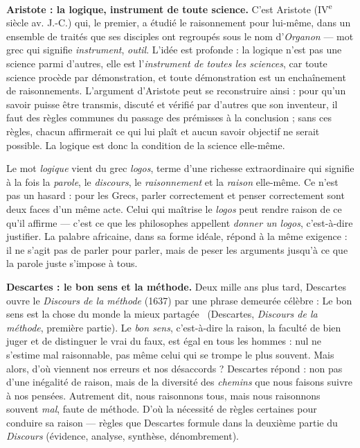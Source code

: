 \documentclass[11pt]{article}
\begin{document}
\textbf{Aristote : la logique, instrument de toute science.} C'est Aristote (IV\textsuperscript{e} siècle av. J.-C.) qui, le premier, a étudié le raisonnement pour lui-même, dans un ensemble de traités que ses disciples ont regroupés sous le nom d'\emph{Organon} — mot grec qui signifie \emph{instrument}, \emph{outil}. L'idée est profonde : la logique n'est pas une science parmi d'autres, elle est l'\emph{instrument de toutes les sciences}, car toute science procède par démonstration, et toute démonstration est un enchaînement de raisonnements. L'argument d'Aristote peut se reconstruire ainsi : pour qu'un savoir puisse être transmis, discuté et vérifié par d'autres que son inventeur, il faut des règles communes du passage des prémisses à la conclusion ; sans ces règles, chacun affirmerait ce qui lui plaît et aucun savoir objectif ne serait possible. La logique est donc la condition de la science elle-même.

\begin{savaistu}
Le mot \emph{logique} vient du grec \emph{logos}, terme d'une richesse extraordinaire qui signifie à la fois la \emph{parole}, le \emph{discours}, le \emph{raisonnement} et la \emph{raison} elle-même. Ce n'est pas un hasard : pour les Grecs, parler correctement et penser correctement sont deux faces d'un même acte. Celui qui maîtrise le \emph{logos} peut rendre raison de ce qu'il affirme — c'est ce que les philosophes appellent \emph{donner un logos}, c'est-à-dire justifier. La palabre africaine, dans sa forme idéale, répond à la même exigence : il ne s'agit pas de parler pour parler, mais de peser les arguments jusqu'à ce que la parole juste s'impose à tous.
\end{savaistu}

\textbf{Descartes : le bon sens et la méthode.} Deux mille ans plus tard, Descartes ouvre le \emph{Discours de la méthode} (1637) par une phrase demeurée célèbre : \guillemotleft Le bon sens est la chose du monde la mieux partagée \guillemotright\ (Descartes, \emph{Discours de la méthode}, première partie). Le \emph{bon sens}, c'est-à-dire la raison, la faculté de bien juger et de distinguer le vrai du faux, est égal en tous les hommes : nul ne s'estime mal raisonnable, pas même celui qui se trompe le plus souvent. Mais alors, d'où viennent nos erreurs et nos désaccords ? Descartes répond : non pas d'une inégalité de raison, mais de la diversité des \emph{chemins} que nous faisons suivre à nos pensées. Autrement dit, nous raisonnons tous, mais nous raisonnons souvent \emph{mal}, faute de méthode. D'où la nécessité de règles certaines pour conduire sa raison — règles que Descartes formule dans la deuxième partie du \emph{Discours} (évidence, analyse, synthèse, dénombrement).
\end{document}

